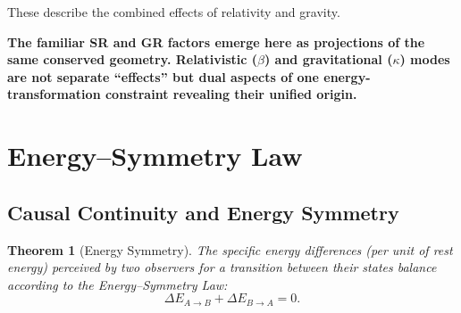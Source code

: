 \documentclass[12pt, a4paper]{article}
\newtheorem{theorem}{Theorem}[section]
\begin{document}
These describe the combined effects of relativity and gravity.

\begin{tcolorbox}[colback=gray!5, colframe=black!80!black, title=Summary]
\textbf{The familiar SR and GR factors emerge here as projections of the same conserved geometry. 
Relativistic ($\beta$) and gravitational ($\kappa$) modes are not separate “effects” but dual aspects of one energy-transformation constraint revealing their unified origin.}
\end{tcolorbox}


\section{Energy–Symmetry Law}\label{sec:energy-symmetry}

\subsection{Causal Continuity and Energy Symmetry}
\begin{theorem}[Energy Symmetry]
The specific energy differences (per unit of rest energy) perceived by two observers for a transition between their states balance according to the Energy–Symmetry Law:
\begin{equation}
\Delta E_{A \to B} + \Delta E_{B \to A} = 0.
\end{equation}
\end{theorem}
\end{document}
